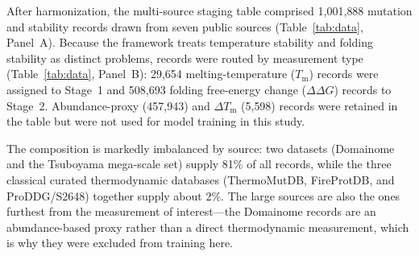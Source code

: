 \documentclass[journal,article,submit,moreauthors]{Definitions/mdpi}
\newcommand{\ddg}{\ensuremath{\Delta\Delta G}}
\newcommand{\Tm}{\ensuremath{T_\mathrm{m}}}
\newcommand{\dtm}{\ensuremath{\Delta T_\mathrm{m}}}
\begin{document}
After harmonization, the multi-source staging table comprised 1{,}001{,}888 mutation and
stability records drawn from seven public sources (Table~\ref{tab:data}, Panel~A). Because
the framework treats temperature stability and folding stability as distinct problems,
records were routed by measurement type (Table~\ref{tab:data}, Panel~B): 29{,}654
melting-temperature (\Tm) records were assigned to Stage~1 and 508{,}693 folding
free-energy change (\ddg) records to Stage~2. Abundance-proxy (457{,}943) and \dtm{}
(5{,}598) records were retained in the table but were not used for model training in this
study.

The composition is markedly imbalanced by source: two datasets (Domainome and the
Tsuboyama mega-scale set) supply 81\% of all records, while the three classical curated
thermodynamic databases (ThermoMutDB, FireProtDB, and ProDDG/S2648) together supply about
2\%. The large sources are also the ones furthest from the measurement of interest---the
Domainome records are an abundance-based proxy rather than a direct thermodynamic
measurement, which is why they were excluded from training here.
\end{document}
